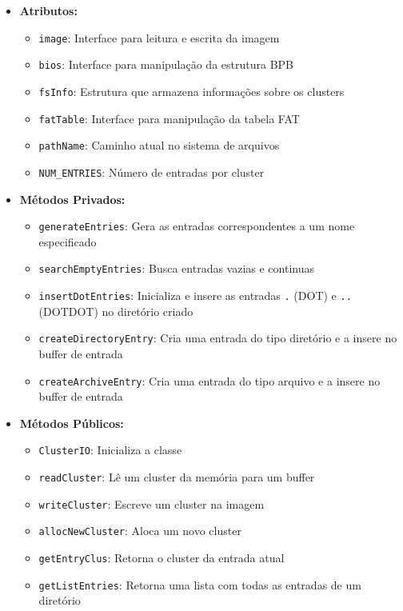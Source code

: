\documentclass[
    12pt,				%
    oneside,   	        %
    a4paper,			%
    english,			%
    french,				%
    spanish,			%
    brazil,				%
    ]{pacotes/abntex2}
\begin{document}
\begin{itemize}
    \item \textbf{Atributos:}
        \begin{itemize}
            \item \texttt{image}: Interface para leitura e escrita da imagem
            \item \texttt{bios}: Interface para manipulação da estrutura BPB
            \item \texttt{fsInfo}: Estrutura que armazena informações sobre os clusters
            \item \texttt{fatTable}: Interface para manipulação da tabela FAT
            \item \texttt{pathName}: Caminho atual no sistema de arquivos
            \item \texttt{NUM\_ENTRIES}: Número de entradas por cluster
        \end{itemize}
    \item \textbf{Métodos Privados:}
        \begin{itemize}
            \item \texttt{generateEntries}: Gera as entradas correspondentes a um nome especificado
            \item \texttt{searchEmptyEntries}: Busca entradas vazias e continuas
            \item \texttt{insertDotEntries}: Inicializa e insere as entradas \texttt{.} (DOT) e \texttt{..} (DOTDOT) no diretório criado
            \item \texttt{createDirectoryEntry}: Cria uma entrada do tipo diretório e a insere no buffer de entrada
            \item \texttt{createArchiveEntry}: Cria uma entrada do tipo arquivo e a insere no buffer de entrada
        \end{itemize}
    \item \textbf{Métodos Públicos:}
        \begin{itemize}
            \item \texttt{ClusterIO}: Inicializa a classe
            \item \texttt{readCluster}: Lê um cluster da memória para um buffer
            \item \texttt{writeCluster}: Escreve um cluster na imagem
            \item \texttt{allocNewCluster}: Aloca um novo cluster
            \item \texttt{getEntryClus}: Retorna o cluster da entrada atual
            \item \texttt{getListEntries}: Retorna uma lista com todas as entradas de um diretório

\end{itemize}
\end{itemize}
\end{document}
